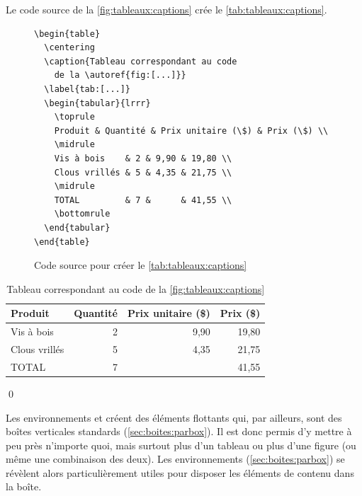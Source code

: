 \begin{exemple}
  Le code source de la \autoref{fig:tableaux:captions} crée
  le \autoref{tab:tableaux:captions}.
  \begin{figure}
\begin{lstlisting}
\begin{table}
  \centering
  \caption{Tableau correspondant au code
    de la \autoref{fig:[...]}}
  \label{tab:[...]}
  \begin{tabular}{lrrr}
    \toprule
    Produit & Quantité & Prix unitaire (\$) & Prix (\$) \\
    \midrule
    Vis à bois    & 2 & 9,90 & 19,80 \\
    Clous vrillés & 5 & 4,35 & 21,75 \\
    \midrule
    TOTAL         & 7 &      & 41,55 \\
    \bottomrule
  \end{tabular}
\end{table}
\end{lstlisting}
    \caption{Code source pour créer le \autoref{tab:tableaux:captions}}
    \label{fig:tableaux:captions}
  \end{figure}
  \begin{table}
    \centering
    \caption{Tableau correspondant au code de la \autoref{fig:tableaux:captions}}
    \label{tab:tableaux:captions}
    \begin{tabular}{lrrr}
      \toprule
      Produit & Quantité & Prix unitaire (\$) & Prix (\$) \\
      \midrule
      Vis à bois    & 2 & 9,90 & 19,80 \\
      Clous vrillés & 5 & 4,35 & 21,75 \\
      \midrule
      TOTAL         & 7 &      & 41,55 \\
      \bottomrule
    \end{tabular}
  \end{table}
  \qed
\end{exemple}

Les environnements  et  créent des éléments
flottants qui, par ailleurs, sont des boîtes verticales standards
(\autoref{sec:boites:parbox}). Il est donc permis d'y mettre à peu
près n'importe quoi, mais surtout plus d'un tableau ou plus d'une
figure (ou même une combinaison des deux). Les environnements
 (\autoref{sec:boites:parbox}) se révèlent alors
particulièrement utiles pour disposer les éléments de contenu dans la
boîte.

